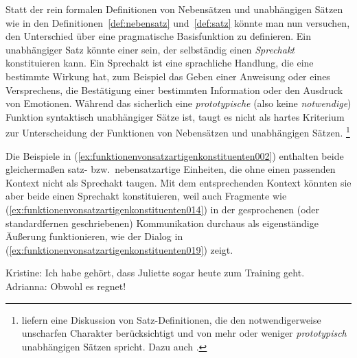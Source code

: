 Statt der rein formalen Definitionen von Nebensätzen und unabhängigen Sätzen wie in den Definitionen~\ref{def:nebensatz} und~\ref{def:satz} könnte man nun versuchen, den Unterschied über eine pragmatische Basisfunktion zu definieren.
Ein unabhängiger Satz könnte einer sein, der selbständig einen \textit{Sprechakt} konstituieren kann.
Ein Sprechakt ist eine sprachliche Handlung, die eine bestimmte Wirkung hat, zum Beispiel das Geben einer Anweisung oder eines Versprechens, die Bestätigung einer bestimmten Information oder den Ausdruck von Emotionen.
Während das sicherlich eine \textit{prototypische} (also keine \textit{notwendige}) Funktion syntaktisch unabhängiger Sätze ist, taugt es nicht als hartes Kriterium zur Unterscheidung der Funktionen von Nebensätzen und unabhängigen Sätzen.%
\footnote{\citet{PantherKoepcke2008} liefern eine Diskussion von Satz-Definitionen, die den notwendigerweise unscharfen Charakter berücksichtigt und von mehr oder weniger \textit{prototypisch} unabhängigen Sätzen spricht.
Dazu auch \citet{SchaeferSayatz2016}.}

Die Beispiele in (\ref{ex:funktionenvonsatzartigenkonstituenten002}) enthalten beide gleichermaßen satz- bzw.\ nebensatzartige Einheiten, die ohne einen passenden Kontext nicht als Sprechakt taugen.
Mit dem entsprechenden Kontext könnten sie aber beide einen Sprechakt konstituieren, weil auch Fragmente wie (\ref{ex:funktionenvonsatzartigenkonstituenten014}) in der gesprochenen (oder standardfernen geschriebenen) Kommunikation durchaus als eigenständige Äußerung funktionieren, wie der Dialog in (\ref{ex:funktionenvonsatzartigenkonstituenten019}) zeigt.

\begin{exe}
  \ex\label{ex:funktionenvonsatzartigenkonstituenten012}
  \begin{xlist}
  \end{xlist}
  \ex\label{ex:funktionenvonsatzartigenkonstituenten019} Kristine: Ich habe gehört, dass Juliette sogar heute zum Training geht.\\
  Adrianna: Obwohl es regnet!
\end{exe}

